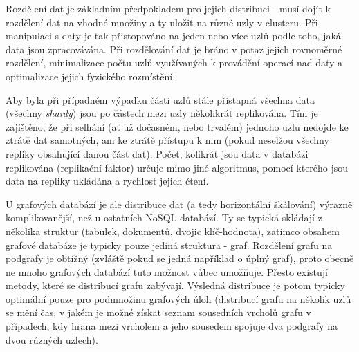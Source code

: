 Rozdělení dat je základním předpokladem pro jejich distribuci - musí dojít k rozdělení dat na vhodné množiny a ty uložit na různé uzly v clusteru. Při manipulaci s daty je tak přistopováno na jeden nebo více uzlů podle toho, jaká data jsou zpracovávána. Při rozdělování dat je bráno v potaz jejich rovnoměrné rozdělení, minimalizace počtu uzlů využívaných k provádění operací nad daty a optimalizace jejich fyzického rozmístění. 

Aby byla při případném výpadku části uzlů stále přístapná všechna data (všechny \textit{shardy}) jsou po částech mezi uzly několikrát replikována. Tím je zajištěno, že při selhání (ať už dočasném, nebo trvalém) jednoho uzlu nedojde ke ztrátě dat samotných, ani ke ztrátě přístupu k nim (pokud neselžou všechny repliky obsahující danou část dat). Počet, kolikrát jsou data v databázi replikována (replikační faktor) určuje mimo jiné algoritmus, pomocí kterého jsou data na repliky ukládána a rychlost jejich čtení. 

U grafových databází je ale distribuce dat (a tedy horizontální škálování) výrazně komplikovanější, než u ostatních NoSQL databází. Ty se typická skládají z několika struktur (tabulek, dokumentů, dvojic klíč-hodnota), zatímco obsahem grafové databáze je typicky pouze jediná struktura - graf. Rozdělení grafu na podgrafy je obtížný (zvláště pokud se jedná například o úplný graf), proto obecně ne mnoho grafových databází tuto možnost vůbec umožňuje. Přesto existují metody, které se distribucí grafu zabývají. Výsledná distribuce je potom typicky optimální pouze pro podmnožinu grafových úloh (distribucí grafu na několik uzlů se mění čas, v jakém je možné získat seznam sousedních vrcholů grafu v případech, kdy hrana mezi vrcholem a jeho sousedem spojuje dva podgrafy na dvou různých uzlech). 












